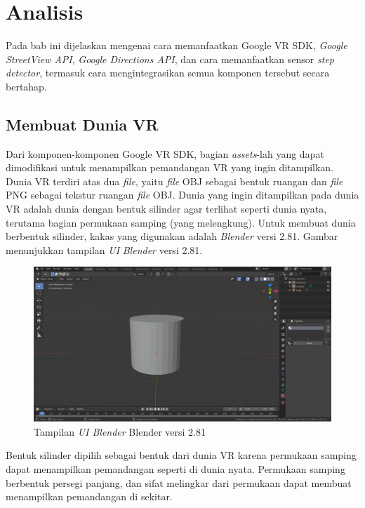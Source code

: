 \chapter{Analisis}
\label{chap:analisis}
Pada bab ini dijelaskan mengenai cara memanfaatkan Google VR SDK, \textit{Google StreetView API}, \textit{Google Directions API}, dan cara memanfaatkan sensor \textit{step detector}, termasuk cara mengintegrasikan semua komponen tersebut secara bertahap. 

\section{Membuat Dunia VR}
Dari komponen-komponen Google VR SDK, bagian \textit{assets}-lah yang dapat dimodifikasi untuk menampilkan pemandangan VR yang ingin ditampilkan. Dunia VR terdiri atas dua \textit{file}, yaitu \textit{file} OBJ sebagai bentuk ruangan dan \textit{file} PNG sebagai tekstur ruangan \textit{file} OBJ. Dunia yang ingin ditampilkan pada dunia VR adalah dunia dengan bentuk silinder agar terlihat seperti dunia nyata, terutama bagian permukaan samping (yang melengkung). Untuk membuat dunia berbentuk silinder, kakas yang digunakan adalah \textit{Blender} versi 2.81. Gambar menunjukkan tampilan \textit{UI} \textit{Blender} versi 2.81.

\begin{figure}[h]
	\centering
		\includegraphics[scale=0.4]{Gambar/blender.png}
	\caption{Tampilan \textit{UI Blender} Blender versi 2.81}
	\label{fig:blender-ui}
\end{figure}

Bentuk silinder dipilih sebagai bentuk dari dunia VR karena permukaan samping dapat menampilkan pemandangan seperti di dunia nyata. Permukaan samping berbentuk persegi panjang, dan sifat melingkar dari permukaan dapat membuat menampilkan pemandangan di sekitar.

